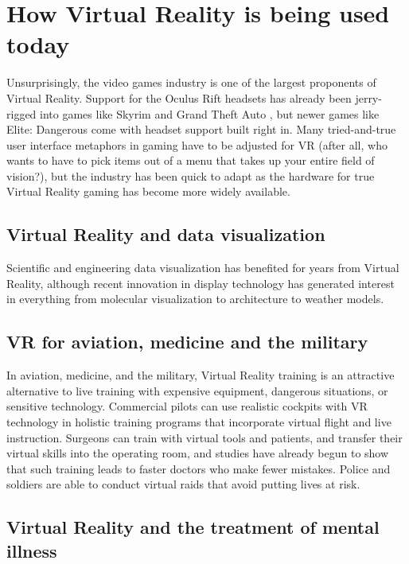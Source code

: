 \section{How Virtual Reality is being used today}

Unsurprisingly, the video games industry is one of the largest proponents of Virtual Reality. Support for the Oculus Rift headsets has already been jerry-rigged into games like Skyrim and Grand Theft Auto , but newer games like Elite: Dangerous come with headset support built right in. Many tried-and-true user interface metaphors in gaming have to be adjusted for VR (after all, who wants to have to pick items out of a menu that takes up your entire field of vision?), but the industry has been quick to adapt as the hardware for true Virtual Reality gaming has become more widely available.

\newpage
	\subsection{Virtual Reality and data visualization}

	Scientific and engineering data visualization has benefited for years from Virtual Reality, although recent innovation in display technology has generated interest in everything from molecular visualization to architecture to weather models.

	\subsection{VR for aviation, medicine and the military}
	
	In aviation, medicine, and the military, Virtual Reality training is an  attractive alternative to live training with expensive equipment, dangerous situations, or sensitive technology. Commercial pilots can use realistic cockpits with VR technology in holistic training programs that incorporate virtual flight and live instruction. Surgeons can train with virtual tools and patients, and transfer their virtual skills into the operating room, and studies have already begun to show that such training leads to faster doctors who make fewer mistakes. Police and soldiers are able to conduct virtual raids that avoid putting lives at risk.
	
	\subsection{Virtual Reality and the treatment of mental illness}
	
